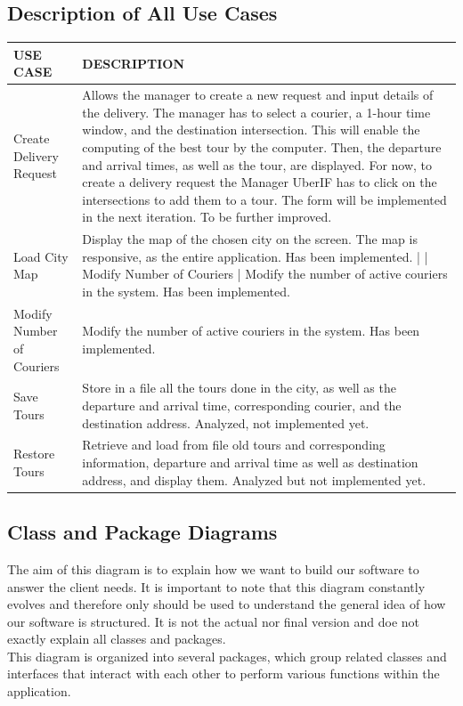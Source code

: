 \documentclass{article}
\begin{document}
\subsection{Description of All Use Cases}
\begin{longtable}{|m{5cm}|m{10cm}|}
\hline
USE CASE & DESCRIPTION \\
\hline
Create Delivery Request & Allows the manager to create a new request and input details of the delivery. The manager has to select a courier, a 1-hour time window, and the destination intersection. This will enable the computing of the best tour by the computer. Then, the departure and arrival times, as well as the tour, are displayed. For now, to create a delivery request the Manager UberIF has to click on the intersections to add them to a tour. The form will be implemented in the next iteration. To be further improved.  \\
\hline
Load City Map & Display the map of the chosen city on the screen. The map is responsive, as the entire application. Has been implemented.     |
| Modify Number of Couriers | Modify the number of active couriers in the system. Has been implemented.  \\
\hline
Modify Number of Couriers & Modify the number of active couriers in the system. Has been implemented.  \\
\hline
Save Tours & Store in a file all the tours done in the city, as well as the departure and arrival time, corresponding courier, and the destination address. Analyzed, not implemented yet. \\
\hline
Restore Tours & Retrieve and load from file old tours and corresponding information, departure and arrival time as well as destination address, and display them. Analyzed but not implemented yet. \\
\hline
\end{longtable}

\subsection{Class and Package Diagrams}
The aim of this diagram is to explain how we want to build our software to answer the client needs. It is important to note that this diagram constantly evolves and therefore only should be used to understand the general idea of how our software is structured. It is not the actual nor final version and doe not exactly explain all classes and packages.
\\
This diagram is organized into several packages, which group related classes and interfaces that interact with each other to perform various functions within the application.
\end{document}
